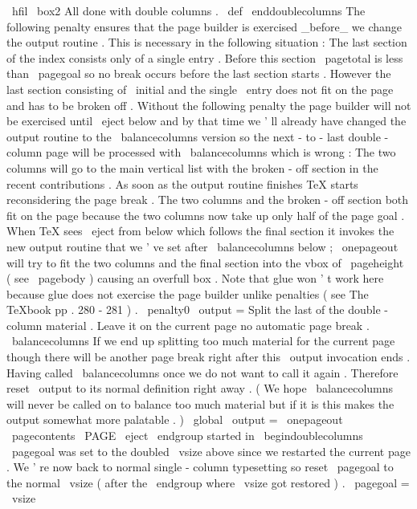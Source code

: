 {{{{{{\
hfil
\
box2
}
%
}
%
%
All
done
with
double
columns
.
\
def
\
enddoublecolumns
{
%
%
The
following
penalty
ensures
that
the
page
builder
is
exercised
%
_before_
we
change
the
output
routine
.
This
is
necessary
in
the
%
following
situation
:
%
%
The
last
section
of
the
index
consists
only
of
a
single
entry
.
%
Before
this
section
\
pagetotal
is
less
than
\
pagegoal
so
no
%
break
occurs
before
the
last
section
starts
.
However
the
last
%
section
consisting
of
\
initial
and
the
single
\
entry
does
not
%
fit
on
the
page
and
has
to
be
broken
off
.
Without
the
following
%
penalty
the
page
builder
will
not
be
exercised
until
\
eject
%
below
and
by
that
time
we
'
ll
already
have
changed
the
output
%
routine
to
the
\
balancecolumns
version
so
the
next
-
to
-
last
%
double
-
column
page
will
be
processed
with
\
balancecolumns
which
%
is
wrong
:
The
two
columns
will
go
to
the
main
vertical
list
with
%
the
broken
-
off
section
in
the
recent
contributions
.
As
soon
as
%
the
output
routine
finishes
TeX
starts
reconsidering
the
page
%
break
.
The
two
columns
and
the
broken
-
off
section
both
fit
on
the
%
page
because
the
two
columns
now
take
up
only
half
of
the
page
%
goal
.
When
TeX
sees
\
eject
from
below
which
follows
the
final
%
section
it
invokes
the
new
output
routine
that
we
'
ve
set
after
%
\
balancecolumns
below
;
\
onepageout
will
try
to
fit
the
two
columns
%
and
the
final
section
into
the
vbox
of
\
pageheight
(
see
%
\
pagebody
)
causing
an
overfull
box
.
%
%
Note
that
glue
won
'
t
work
here
because
glue
does
not
exercise
the
%
page
builder
unlike
penalties
(
see
The
TeXbook
pp
.
280
-
281
)
.
\
penalty0
%
\
output
=
{
%
%
Split
the
last
of
the
double
-
column
material
.
Leave
it
on
the
%
current
page
no
automatic
page
break
.
\
balancecolumns
%
%
If
we
end
up
splitting
too
much
material
for
the
current
page
%
though
there
will
be
another
page
break
right
after
this
\
output
%
invocation
ends
.
Having
called
\
balancecolumns
once
we
do
not
%
want
to
call
it
again
.
Therefore
reset
\
output
to
its
normal
%
definition
right
away
.
(
We
hope
\
balancecolumns
will
never
be
%
called
on
to
balance
too
much
material
but
if
it
is
this
makes
%
the
output
somewhat
more
palatable
.
)
\
global
\
output
=
{
\
onepageout
{
\
pagecontents
\
PAGE
}
}
%
}
%
\
eject
\
endgroup
%
started
in
\
begindoublecolumns
%
%
\
pagegoal
was
set
to
the
doubled
\
vsize
above
since
we
restarted
%
the
current
page
.
We
'
re
now
back
to
normal
single
-
column
%
typesetting
so
reset
\
pagegoal
to
the
normal
\
vsize
(
after
the
%
\
endgroup
where
\
vsize
got
restored
)
.
\
pagegoal
=
\
vsize
}
}}}}

